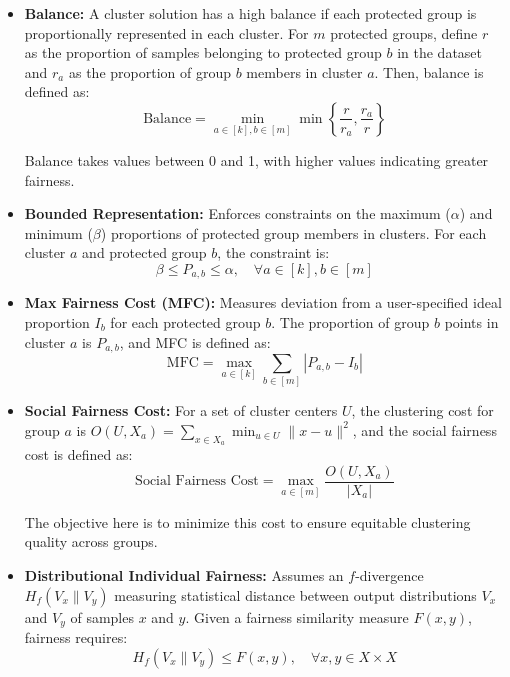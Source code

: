 \begin{itemize}

  \item \textbf{Balance:} A cluster solution has a high balance if
    each protected group is proportionally represented in each
    cluster. For \(m\) protected groups, define \(r\) as the
    proportion of samples belonging to protected group \(b\) in the
    dataset and \(r_a\) as the proportion of group \(b\) members in
    cluster \(a\). Then, balance is defined as:
    \[
      \text{Balance} = \min_{a\in [k], b\in [m]}
      \min\left\{\frac{r}{r_a}, \frac{r_a}{r}\right\}
    \]

    Balance takes values between 0 and 1, with higher values
    indicating greater fairness.

  \item \textbf{Bounded Representation:} Enforces constraints on the
    maximum (\(\alpha\)) and minimum (\(\beta\)) proportions of
    protected group members in clusters. For each cluster \(a\) and
    protected group \(b\), the constraint is:
    \[
      \beta \leq P_{a,b} \leq \alpha, \quad \forall a\in [k], b\in [m]
    \]

  \item \textbf{Max Fairness Cost (MFC):} Measures deviation from a
    user-specified ideal proportion \(I_b\) for each protected group
    \(b\). The proportion of group \(b\) points in cluster \(a\) is
    \(P_{a,b}\), and MFC is defined as:
    \[
      \text{MFC} = \max_{a\in [k]} \sum_{b\in [m]} |P_{a,b} - I_b|
    \]

  \item \textbf{Social Fairness Cost:} For a set of cluster centers
    \(U\), the clustering cost for group \(a\) is \(O(U, X_a) =
    \sum_{x \in X_a} \min_{u \in U}\|x - u\|^2\), and the social
    fairness cost is defined as:
    \[
      \text{Social Fairness Cost} = \max_{a \in [m]} \frac{O(U, X_a)}{|X_a|}
    \]

    The objective here is to minimize this cost to ensure equitable
    clustering quality across groups.

  \item \textbf{Distributional Individual Fairness:} Assumes an
    \(f\)-divergence \(H_f(V_x \| V_y)\) measuring statistical
    distance between output distributions \(V_x\) and \(V_y\) of
    samples \(x\) and \(y\). Given a fairness similarity measure
    \(F(x,y)\), fairness requires:
    \[
      H_f(V_x \| V_y) \leq F(x,y), \quad \forall x,y \in X \times X
    \]


\end{itemize}
